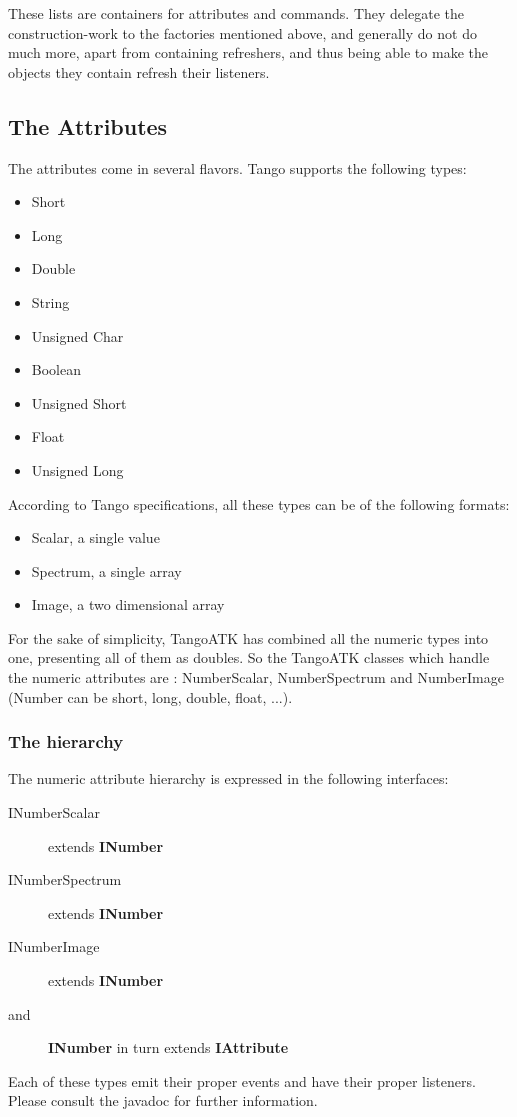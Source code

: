 These lists are containers for attributes and commands. They delegate
the construction-work to the factories mentioned above, and generally
do not do much more, apart from containing refreshers, and thus being
able to make the objects they contain refresh their listeners.

\subsection{The Attributes}

The attributes come in several flavors. Tango supports
the following types:
\begin{itemize}
\item Short 
\item Long 
\item Double
\item String 
\item Unsigned Char
\item Boolean
\item Unsigned Short
\item Float
\item Unsigned Long
\end{itemize}
According to Tango specifications, all these types can be of the following
formats:
\begin{itemize}
\item Scalar, a single value 
\item Spectrum, a single array 
\item Image, a two dimensional array 
\end{itemize}
For the sake of simplicity, TangoATK has combined all the numeric
types into one, presenting all of them as doubles. So the TangoATK
classes which handle the numeric attributes are : NumberScalar, NumberSpectrum
and NumberImage (Number can be short, long, double, float, ...).

\subsubsection{The hierarchy}

The numeric attribute hierarchy is expressed in the following interfaces:
\begin{description}
\item [{INumberScalar}] extends \textbf{INumber}
\item [{INumberSpectrum}] extends \textbf{INumber}
\item [{INumberImage}] extends \textbf{INumber}
\item [{\textmd{and}}] \textbf{INumber} in turn extends \textbf{IAttribute}
~
\end{description}
Each of these types emit their proper events and have their proper
listeners. Please consult the javadoc for further information.

